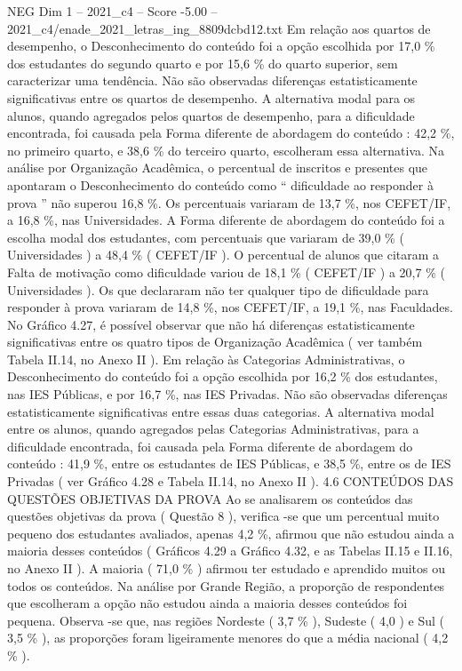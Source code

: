 \begin{textsample}{NEG Dim 1 – 2021\_c4 – Score -5.00 – 2021\_c4/enade\_2021\_letras\_ing\_8809dcbd12.txt}
Em relação aos quartos de desempenho, o Desconhecimento do conteúdo foi a opção escolhida por 17,0 \% dos estudantes do segundo quarto e por 15,6 \% do quarto superior, sem caracterizar uma tendência.
Não são observadas diferenças estatisticamente significativas entre os quartos de desempenho.
A alternativa modal para os alunos, quando agregados pelos quartos de desempenho, para a dificuldade encontrada, foi causada pela Forma diferente de abordagem do conteúdo : 42,2 \%, no primeiro quarto, e 38,6 \% do terceiro quarto, escolheram essa alternativa.
Na análise por Organização Acadêmica, o percentual de inscritos e presentes que apontaram o Desconhecimento do conteúdo como “ dificuldade ao responder à prova ” não superou 16,8 \%.
Os percentuais variaram de 13,7 \%, nos CEFET/IF, a 16,8 \%, nas Universidades.
A Forma diferente de abordagem do conteúdo foi a escolha modal dos estudantes, com percentuais que variaram de 39,0 \% ( Universidades ) a 48,4 \% ( CEFET/IF ).
O percentual de alunos que citaram a Falta de motivação como dificuldade variou de 18,1 \% ( CEFET/IF ) a 20,7 \% ( Universidades ).
Os que declararam não ter qualquer tipo de dificuldade para responder à prova variaram de 14,8 \%, nos CEFET/IF, a 19,1 \%, nas Faculdades.
No Gráfico 4.27, é possível observar que não há diferenças estatisticamente significativas entre os quatro tipos de Organização Acadêmica ( ver também Tabela II.14, no Anexo II ).
Em relação às Categorias Administrativas, o Desconhecimento do conteúdo foi a opção escolhida por 16,2 \% dos estudantes, nas IES Públicas, e por 16,7 \%, nas IES Privadas.
Não são observadas diferenças estatisticamente significativas entre essas duas categorias.
A alternativa modal entre os alunos, quando agregados pelas Categorias Administrativas, para a dificuldade encontrada, foi causada pela Forma diferente de abordagem do conteúdo : 41,9 \%, entre os estudantes de IES Públicas, e 38,5 \%, entre os de IES Privadas ( ver Gráfico 4.28 e Tabela II.14, no Anexo II ). 4.6 CONTEÚDOS DAS QUESTÕES OBJETIVAS DA PROVA Ao se analisarem os conteúdos das questões objetivas da prova ( Questão 8 ), verifica -se que um percentual muito pequeno dos estudantes avaliados, apenas 4,2 \%, afirmou que não estudou ainda a maioria desses conteúdos ( Gráficos 4.29 a Gráfico 4.32, e as Tabelas II.15 e II.16, no Anexo II ).
A maioria ( 71,0 \% ) afirmou ter estudado e aprendido muitos ou todos os conteúdos.
Na análise por Grande Região, a proporção de respondentes que escolheram a opção não estudou ainda a maioria desses conteúdos foi pequena.
Observa -se que, nas regiões Nordeste ( 3,7 \% ), Sudeste ( 4,0 ) e Sul ( 3,5 \% ), as proporções foram ligeiramente menores do que a média nacional ( 4,2 \% ).

\end{textsample}
